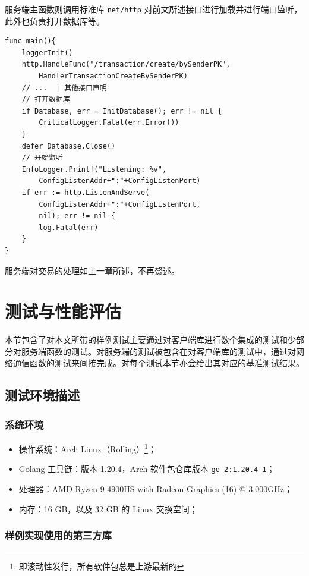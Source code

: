 服务端主函数则调用标准库 \texttt{net/http} 对前文所述接口进行加载并进行端口监听，此外也负责打开数据库等。

\begin{verbatim}
func main(){
    loggerInit()
    http.HandleFunc("/transaction/create/bySenderPK", 
        HandlerTransactionCreateBySenderPK)
    // ...  | 其他接口声明
    // 打开数据库
    if Database, err = InitDatabase(); err != nil {
        CriticalLogger.Fatal(err.Error())
    }
    defer Database.Close()
    // 开始监听
    InfoLogger.Printf("Listening: %v", 
        ConfigListenAddr+":"+ConfigListenPort)
    if err := http.ListenAndServe(
        ConfigListenAddr+":"+ConfigListenPort,
        nil); err != nil {
        log.Fatal(err)
    }
}
\end{verbatim}

服务端对交易的处理如上一章所述，不再赘述。

\section{测试与性能评估}

本节包含了对本文所带的样例测试主要通过对客户端库进行数个集成的测试和少部分对服务端函数的测试。对服务端的测试被包含在对客户端库的测试中，通过对网络通信函数的测试来间接完成。对每个测试本节亦会给出其对应的基准测试结果。

\subsection{测试环境描述}

\subsubsection*{系统环境}

\begin{itemize}
    \item 操作系统：Arch Linux（Rolling）\footnote{即滚动性发行，所有软件包总是上游最新的}；
    \item Golang 工具链：版本 1.20.4，Arch 软件包仓库版本 \verb|go 2:1.20.4-1|；
    \item 处理器：AMD Ryzen 9 4900HS with Radeon Graphics (16) @ 3.000GHz；
    \item 内存：16 GB，以及 32 GB 的 Linux 交换空间；
\end{itemize}

\subsubsection{样例实现使用的第三方库}

